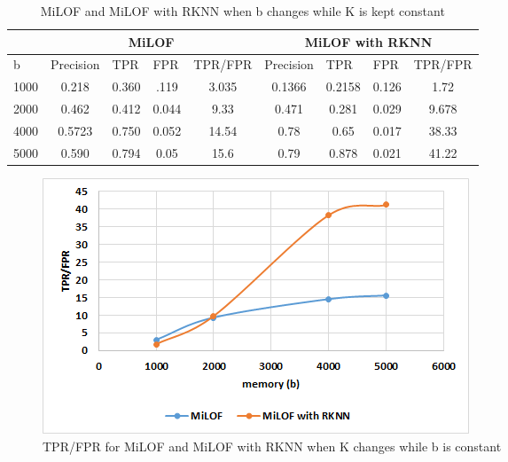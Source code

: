 \begin{table}[H]
	\centering
	\caption{MiLOF and MiLOF with RKNN when b changes while K is kept constant}
	\label{my-label}
	\begin{tabular}{|l|c|c|c|c|c|c|c|c|}
		\hline
		& \multicolumn{4}{c|}{MiLOF}                                                                                                    & \multicolumn{4}{c|}{MiLOF with RKNN}                                                                                          \\ \hline
		b                          & \multicolumn{1}{l|}{Precision} & \multicolumn{1}{l|}{TPR} & \multicolumn{1}{l|}{FPR} & \multicolumn{1}{l|}{TPR/FPR} & \multicolumn{1}{l|}{Precision} & \multicolumn{1}{l|}{TPR} & \multicolumn{1}{l|}{FPR} & \multicolumn{1}{l|}{TPR/FPR} \\ \hline
		1000                       & 0.218                          & 0.360                              & .119                     & 3.035                        & 0.1366                         & 0.2158                             & 0.126                    & 1.72                         \\ \hline
		\multicolumn{1}{|c|}{2000} & 0.462                          & 0.412                              & 0.044                    & 9.33                         & 0.471                          & 0.281                              & 0.029                    & 9.678                        \\ \hline
		\multicolumn{1}{|c|}{4000} & 0.5723                         & 0.750                              & 0.052                    & 14.54                        & 0.78                           & 0.65                               & 0.017                    & 38.33                        \\ \hline
		\multicolumn{1}{|c|}{5000} & 0.590                          & 0.794                              & 0.05                     & 15.6                         & 0.79                           & 0.878                              & 0.021                    & 41.22                        \\ \hline
	\end{tabular}
\end{table}

\begin{figure}[H]
	\centering
	\includegraphics{chap04/varyB2.png}
	\caption{TPR/FPR for MiLOF and MiLOF with RKNN when K changes while b is constant}
\end{figure}